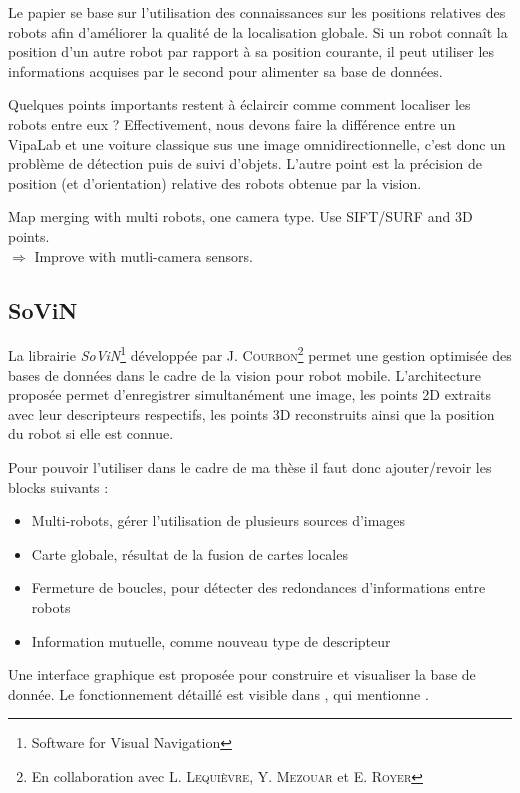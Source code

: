 Le papier \cite{Hukui10} se base sur l'utilisation des connaissances sur les positions relatives des robots afin d'améliorer la qualité de la localisation globale.
Si un robot connaît la position d'un autre robot par rapport à sa position courante, il peut utiliser les informations acquises par le second pour alimenter sa base de données.

Quelques points importants restent à éclaircir comme comment localiser les robots entre eux ?
Effectivement, nous devons faire la différence entre un VipaLab et une voiture classique sus une image omnidirectionnelle, c'est donc un problème de détection puis de suivi d'objets.
L'autre point est la précision de position (et d'orientation) relative des robots obtenue par la vision.






Map merging with multi robots, one camera type. Use SIFT/SURF and 3D points.\\
$\Rightarrow$ Improve with mutli-camera sensors. 



\subsection{SoViN}
\label{subsub:sovin}

       
La librairie \emph{SoViN}\footnote{Software for Visual Navigation} développée par J. \textsc{Courbon}\footnote{En collaboration avec L. \textsc{Lequièvre}, Y. \textsc{Mezouar} et E. \textsc{Royer}} permet une gestion optimisée des bases de données dans le cadre de la vision pour robot mobile.
L'architecture proposée permet d'enregistrer simultanément une image, les points 2D extraits avec leur descripteurs respectifs, les points 3D reconstruits ainsi que la position du robot si elle est connue.

Pour pouvoir l'utiliser dans le cadre de ma thèse il faut donc ajouter/revoir les blocks suivants :
\begin{itemize}
\item Multi-robots, gérer l'utilisation de plusieurs sources d'images
\item Carte globale, résultat de la fusion de cartes locales
\item Fermeture de boucles, pour détecter des redondances d'informations entre robots
\item Information mutuelle, comme nouveau type de descripteur
\end{itemize}


Une interface graphique est proposée pour construire et visualiser la base de donnée.
Le fonctionnement détaillé est visible dans \cite{Lequievre08}, qui mentionne .
